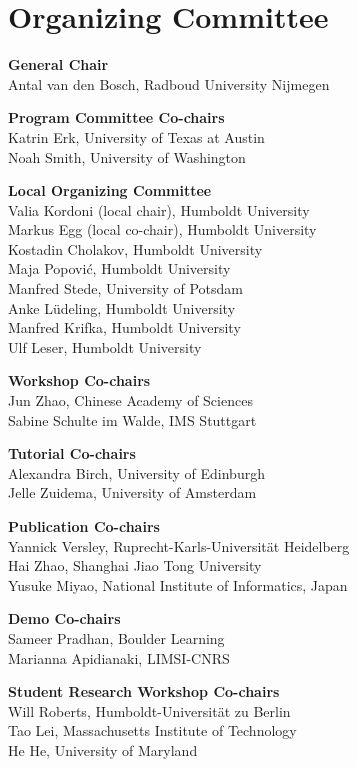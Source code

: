 \markboth{}{} %
\markright{}{} %

\section{Organizing Committee}{}

\setlength{\parindent}{0pt}

{\bf General Chair} \\
Antal van den Bosch, Radboud University Nijmegen

{\bf Program Committee Co-chairs} \\
Katrin Erk, University of Texas at Austin \\
Noah Smith, University of Washington

{\bf Local Organizing Committee} \\
Valia Kordoni (local chair), Humboldt University \\
Markus Egg (local co-chair), Humboldt University \\
Kostadin Cholakov, Humboldt University \\
Maja Popović, Humboldt University \\
Manfred Stede, University of Potsdam \\
Anke Lüdeling, Humboldt University \\
Manfred Krifka, Humboldt University \\
Ulf Leser, Humboldt University 

{\bf Workshop Co-chairs} \\
Jun Zhao, Chinese Academy of Sciences \\
Sabine Schulte im Walde, IMS Stuttgart

{\bf Tutorial Co-chairs} \\
Alexandra Birch, University of Edinburgh \\
Jelle Zuidema, University of Amsterdam

{\bf Publication Co-chairs} \\
Yannick Versley, Ruprecht-Karls-Universität Heidelberg \\
Hai Zhao, Shanghai Jiao Tong University \\
Yusuke Miyao, National Institute of Informatics, Japan

{\bf Demo Co-chairs} \\
Sameer Pradhan, Boulder Learning \\
Marianna Apidianaki, LIMSI-CNRS

{\bf Student Research Workshop Co-chairs} \\
Will Roberts, Humboldt-Universität zu Berlin \\
Tao Lei, Massachusetts Institute of Technology \\
He He, University of Maryland 

